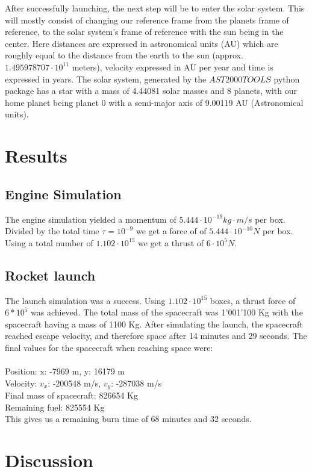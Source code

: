 \documentclass[reprint,english,notitlepage]{revtex4-2}
\begin{document}
After successfully launching, the next step will be to enter the solar system.
This will mostly consist of changing our reference frame from the planets frame of reference, to the solar system's frame of reference with the sun being in the center.
Here distances are expressed in astronomical units (AU) which are roughly equal to the distance from the earth to the sun (approx. $1.495978707 \cdot 10^{11}$ meters), velocity expressed in AU per year and time is expressed in years.
The solar system, generated by the $AST2000TOOLS$ python package has a star with a mass of 4.44081 solar masses and 8 planets, with our home planet being planet 0 with a semi-major axis of 9.00119 AU (Astronomical units).

\section{Results}
	\subsection{Engine Simulation}
	The engine simulation yielded a momentum of $ 5.444 \cdot 10^{-19}kg \cdot  m / s $ per box.
	Divided by the total time $ \tau = 10^{-9}$ we get a force of of $5.444 \cdot 10^{-10}N $ per box.
	Using a total number of $ 1.102 \cdot  10^{15} $ we get a thrust of $ 6 \cdot  10^{5} N $.

	\subsection{Rocket launch}
	The launch simulation was a success. Using $1.102 \cdot  10^{15}$ boxes, a thrust force of $6*10^5$ was achieved. The total mass of the spacecraft was 1'001'100 Kg with the spacecraft having a mass of 1100 Kg.
	After simulating the launch, the spacecraft reached escape velocity, and therefore space after 14 minutes and 29 seconds. The final values for the spacecraft when reaching space were:\\\\
	Position: x: -7969 m, y: 16179 m\\
	Velocity: $v_x$: -200548 m/s, $v_y$: -287038 m/s\\
	Final mass of spacecraft: 826654 Kg\\
	Remaining fuel: 825554 Kg\\
	This gives us a remaining burn time of 68 minutes and 32 seconds.


\section{Discussion}
\end{document}

